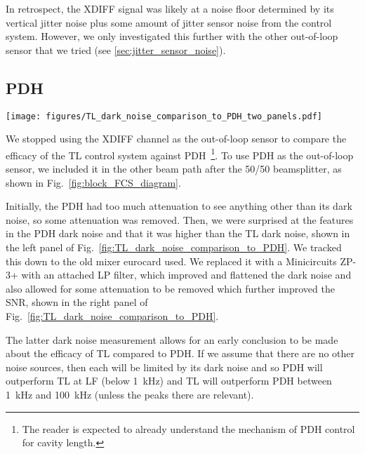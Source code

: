\documentclass[aps,pra,superscriptaddress,reprint,nofootinbib]{revtex4-1}
\begin{document}
In retrospect, the XDIFF signal was likely at a noise floor determined by its vertical jitter noise plus some amount of jitter sensor noise from the control system. However, we only investigated this further with the other out-of-loop sensor that we tried (see \ref{sec:jitter_sensor_noise}).


\subsection{PDH}
\label{sec:PDH_out-of-loop}

\begin{figure*}
    \texttt{[image: figures/TL\_dark\_noise\_comparison\_to\_PDH\_two\_panels.pdf]}
	\caption{SR785 measurements from 2021-01-13/14 of the TL and PDH dark noise. Showing PDH dark noise from the old eurocard mixer (left panel) and from the new mixer (right panel). The new mixer flattens the PDH dark noise and brings it under TL at LF.}
	\label{fig:TL_dark_noise_comparison_to_PDH}
\end{figure*}

We stopped using the XDIFF channel as the out-of-loop sensor to compare the efficacy of the TL control system against PDH~\footnote{The reader is expected to already understand the mechanism of PDH control for cavity length.}. To use PDH as the out-of-loop sensor, we included it in the other beam path after the 50/50 beamsplitter, as shown in Fig.~\ref{fig:block_FCS_diagram}.

Initially, the PDH had too much attenuation to see anything other than its dark noise, so some attenuation was removed. Then, we were surprised at the features in the PDH dark noise and that it was higher than the TL dark noise, shown in the left panel of Fig.~\ref{fig:TL_dark_noise_comparison_to_PDH}. We tracked this down to the old mixer eurocard used. We replaced it with a Minicircuits ZP-3+ with an attached LP filter, which improved and flattened the dark noise and also allowed for some attenuation to be removed which further improved the SNR, shown in the right panel of Fig.~\ref{fig:TL_dark_noise_comparison_to_PDH}.

The latter dark noise measurement allows for an early conclusion to be made about the efficacy of TL compared to PDH. If we assume that there are no other noise sources, then each will be limited by its dark noise and so PDH will outperform TL at LF (below 1~kHz) and TL will outperform PDH between 1~kHz and 100~kHz (unless the peaks there are relevant).
\end{document}
